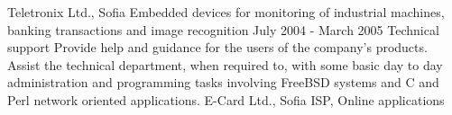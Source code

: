 {
  Teletronix Ltd., Sofia
}
{
  Embedded devices for monitoring of industrial machines, banking
  transactions and image recognition
}
\ecvitem{}{} %
\ecvitem{}{} %
{
  July 2004 - March 2005
}
{
  Technical support
}
{
  Provide help and guidance for the users of the
  company's products. Assist the technical department, when required to, with some basic day to day
  administration and programming tasks involving FreeBSD systems and C and Perl network oriented
  applications.
}
{
  E-Card Ltd., Sofia
}
{
  ISP, Online applications
}


